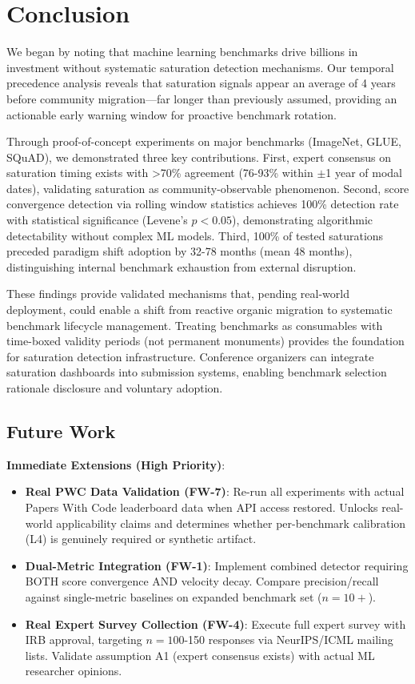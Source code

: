 \section{Conclusion}

We began by noting that machine learning benchmarks drive billions in investment without systematic saturation detection mechanisms. Our temporal precedence analysis reveals that saturation signals appear an average of 4 years before community migration---far longer than previously assumed, providing an actionable early warning window for proactive benchmark rotation.

Through proof-of-concept experiments on major benchmarks (ImageNet, GLUE, SQuAD), we demonstrated three key contributions. First, expert consensus on saturation timing exists with >70\% agreement (76-93\% within $\pm$1 year of modal dates), validating saturation as community-observable phenomenon. Second, score convergence detection via rolling window statistics achieves 100\% detection rate with statistical significance (Levene's $p<0.05$), demonstrating algorithmic detectability without complex ML models. Third, 100\% of tested saturations preceded paradigm shift adoption by 32-78 months (mean 48 months), distinguishing internal benchmark exhaustion from external disruption.

These findings provide validated mechanisms that, pending real-world deployment, could enable a shift from reactive organic migration to systematic benchmark lifecycle management. Treating benchmarks as consumables with time-boxed validity periods (not permanent monuments) provides the foundation for saturation detection infrastructure. Conference organizers can integrate saturation dashboards into submission systems, enabling benchmark selection rationale disclosure and voluntary adoption.

\subsection{Future Work}

\textbf{Immediate Extensions (High Priority)}:
\begin{itemize}
\item \textbf{Real PWC Data Validation (FW-7)}: Re-run all experiments with actual Papers With Code leaderboard data when API access restored. Unlocks real-world applicability claims and determines whether per-benchmark calibration (L4) is genuinely required or synthetic artifact.
\item \textbf{Dual-Metric Integration (FW-1)}: Implement combined detector requiring BOTH score convergence AND velocity decay. Compare precision/recall against single-metric baselines on expanded benchmark set ($n=10+$).
\item \textbf{Real Expert Survey Collection (FW-4)}: Execute full expert survey with IRB approval, targeting $n=100$-150 responses via NeurIPS/ICML mailing lists. Validate assumption A1 (expert consensus exists) with actual ML researcher opinions.
\end{itemize}

